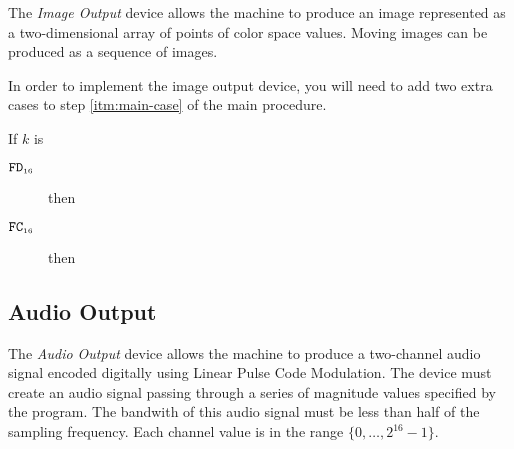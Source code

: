\documentclass[a4paper,12pt]{article}
\newcommand{\num}[1]{\texttt{#1}}
\newcommand{\hex}[1]{\num{#1}_{\textup{\tiny 16}}}
\newcommand{\range}[2]{\{#1,\ldots,#2\}}
\newcommand{\proc}[1]{\textsc{#1}}
\newcommand{\deviceio}[1]{$\langle$#1$\rangle$}
\newcommand{\op}[1]{$#1$}
\theoremstyle{definition}
\newcommand{\SETPIXEL}  [1]{\op{\hex{FC}}}
\newcommand{\NEWFRAME}  [1]{\op{\hex{FD}}}
\begin{document}
The \emph{Image Output} device allows the machine to produce an image represented as a two-dimensional array of points of color space values.
Moving images can be produced as a sequence of images.

In order to implement the image output device, you will need to add two extra cases to step \ref{itm:main-case} of the main procedure.

\begin{stepnumbers}[start=3]
\item If $k$ is
  \begin{description}
  \item[\NEWFRAME{}] then
  \item[\SETPIXEL{}] then
  \end{description}
\end{stepnumbers}

\subsection{Audio Output}

The \emph{Audio Output} device allows the machine to produce a two-channel audio signal encoded digitally using Linear Pulse Code Modulation.
The device must create an audio signal passing through a series of magnitude values specified by the program.
The bandwith of this audio signal must be less than half of the sampling frequency.
Each channel value is in the range $\range{0}{2^{16}-1}$.
\end{document}
